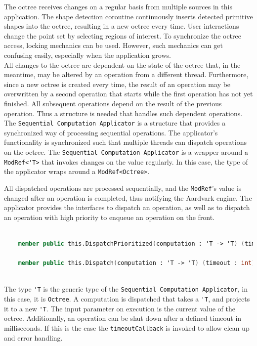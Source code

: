 The octree receives changes on a regular basis from multiple sources in this application. The shape detection coroutine continuously inserts detected primitive shapes into the octree, resulting in a new octree every time. User interactions change the point set by selecting regions of interest. To synchronize the octree access, locking mechanics can be used. However, such mechanics can get confusing easily, especially when the application grows. 
\\
All changes to the octree are dependent on the state of the octree that, in the meantime, may be altered by an operation from a different thread. Furthermore, since a new octree is created every time, the result of an operation may be overwritten by a second operation that starts while the first operation has not yet finished. All subsequent operations depend on the result of the previous operation. Thus a structure is needed that handles such dependent operations. 
\\
The \verb|Sequential Computation Applicator| is a structure that provides a synchronized way of processing sequential operations. The applicator's functionality is synchronized such that multiple threads can dispatch operations on the octree. The \verb|Sequential Computation Applicator| is a wrapper around a \verb|ModRef<'T>| that invokes changes on the value regularly. 
In this case, the type of the applicator wraps around a \verb|ModRef<Octree>|. 

All dispatched operations are processed sequentially, and the \verb|ModRef|'s value is changed after an operation is completed, thus notifying the Aardvark engine. 
The applicator provides the interfaces to dispatch an operation, as well as to dispatch an operation with high priority to enqueue an operation on the front. 

\begin{lstlisting}[language = FSharp]

    member public this.DispatchPrioritized(computation : 'T -> 'T) (timeout : int) (timeoutCallback  : unit -> unit) : unit = ...

    member public this.Dispatch(computation : 'T -> 'T) (timeout : int) (timeoutCallback  : unit -> unit) : unit = ...
   
\end{lstlisting}

The type \verb|'T| is the generic type of the \verb|Sequential Computation Applicator|, in this case, it is \verb|Octree|. A computation is dispatched that takes a \verb|'T|, and projects it to a new \verb|'T|. The input parameter on execution is the current value of the octree. 
Additionally, an operation can be shut down after a defined timeout in milliseconds. If this is the case the \verb|timeoutCallback| is invoked to allow clean up and error handling. 


